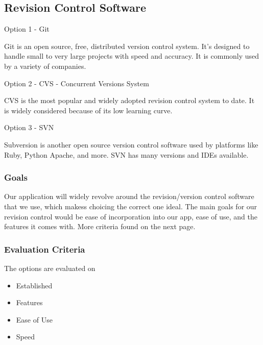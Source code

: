 \documentclass[onecolumn, draftclsnofoot,10pt, compsoc]{IEEEtran}
\begin{document}
{%

\medskip







\newpage
\subsection{Revision Control Software}

{\noindent Option 1 - Git \par}
{\noindent Git is an open source, free, distributed version control system. It's designed to handle small to very large projects with speed and accuracy.
It is commonly used by a variety of companies. \cite{Git} \par}

\medskip
{\noindent Option 2 - CVS - Concurrent Versions System \par}
{\noindent CVS is the most popular and widely adopted revision control system to date. It is widely considered because of its low learning curve. \cite{JaxEnter}  \par}

\medskip
{\noindent Option 3 - SVN \par}
{\noindent Subversion is another open source version control software used by platforms like Ruby, Python Apache, and more. SVN has many versions and IDEs available. \cite{SVN} \par}

\medskip
\subsubsection{Goals}
{\noindent Our application will widely revolve around the revision/version control software that we use, which makess choicing the correct one ideal.
The main goals for our revision control would be ease of incorporation into our app, ease of use, and the features it comes with. More criteria found on the next page. \par}


\subsubsection{Evaluation Criteria}
\noindent The options are evaluated on
\begin{itemize}
\item Established
\item Features
\item Ease of Use
\item Speed
\end{itemize}


}
\end{document}
